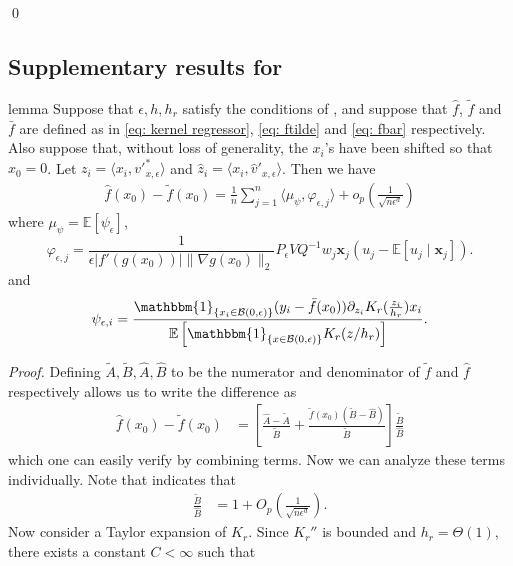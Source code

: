 \documentclass[11pt]{article}
\begin{document}
\begin{appendices}
\qed{}

\subsection{Supplementary results for }


\begin{restatable}{lemma}{}\label{lemma: fhat minus ftilde}
    Suppose that $\epsilon, h, h_r$ satisfy the conditions of , and suppose that $\hat{f}$, $\tilde{f}$ and $\bar{f}$ are defined as in \cref{eq: kernel regressor}, \cref{eq: ftilde} and \cref{eq: fbar} respectively. Also suppose that, without loss of generality, the $x_i$'s have been shifted so that $x_0 = 0$. Let $z_i = \langle x_i, v'^*_{x, \epsilon}\rangle$ and $\hat{z}_i = \langle x_i, \hat{v}'_{x, \epsilon}\rangle$. Then we have
    \begin{align}
        \hat{f}(x_0) - \tilde{f}(x_0) = \frac{1}{n}\sum_{j = 1}^n\langle\mu_{\psi}, \varphi_{\epsilon, j}\rangle + o_p\left(\frac{1}{\sqrt{n\epsilon^d}}\right)
    \end{align}
    where $\mu_{\psi} = \mathbb{E}[\psi_{\epsilon}]$,  
    \[
\varphi_{\epsilon,j}
=
\frac{1}{\epsilon |f'(g(x_0))|\|\nabla g(x_0)\|_2}
P_{\epsilon}VQ^{-1}w_j\boldsymbol{x}_j\left(u_j-\mathbb{E}[u_j\mid \boldsymbol{x}_j]\right).
\]
    and
    \[\psi_{\epsilon, i} = \frac{\mathbbm{1}_{\{x_i \in \mathcal{B}(0, \epsilon)\}}(y_i - \bar{f}(x_0))\partial_{z_i}K_r(\frac{z_i}{h_r})x_i}{\mathbb{E}\left[\mathbbm{1}_{\{x \in \mathcal{B}(0, \epsilon)\}}K_r(z/h_r)\right]}.\]
\end{restatable}
\noindent \textit{Proof.} 
Defining $\tilde{A}, \tilde{B}, \widehat{A}, \widehat{B}$ to be the numerator and denominator of $\tilde{f}$ and $\hat{f}$ respectively allows us to write the difference as
\begin{align}
    \hat{f}(x_0) - \tilde{f}(x_0)  &= \left[\frac{\widehat{A}-\tilde{A}}{\tilde{B}} + \frac{\tilde f(x_0)\left(\tilde{B} - \widehat{B}\right)}{\tilde{B}}\right]\frac{\tilde{B}}{\widehat{B}} \label{eq: kdr estimator decomp}
\end{align}
which one can easily verify by combining terms. Now we can analyze these terms individually. Note that  indicates that
\begin{align*}
    \frac{\tilde{B}}{\widehat{B}} &= 1  + O_p\left(\frac{1}{\sqrt{n\epsilon^d}}\right).
\end{align*}
Now consider a Taylor expansion of $K_r$. Since $K_r''$ is bounded and $h_r=\Theta(1)$, there exists a constant $C<\infty$ such that

\end{appendices}
\end{document}
